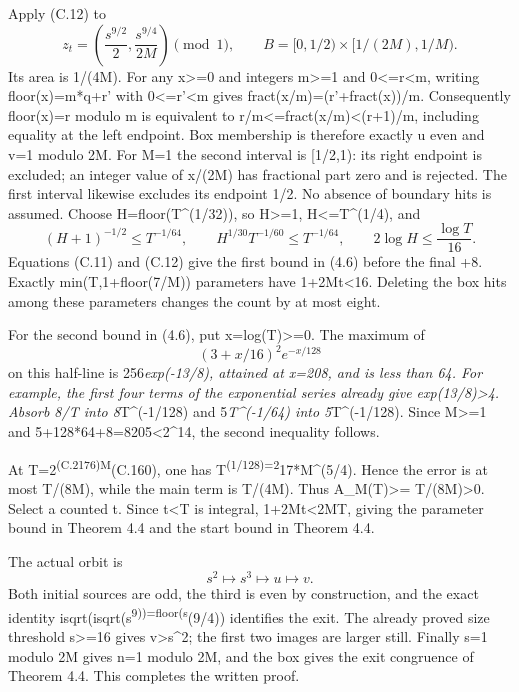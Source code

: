\documentclass[11pt,a4paper]{article}
\begin{document}
Apply (C.12) to \[
z_t=\left(\frac{s^{9/2}}2,\frac{s^{9/4}}{2M}\right)\pmod1,
\qquad B=[0,1/2)\mathbin{\times}[1/(2M),1/M).
\] Its area is 1/(4M). For any x\textgreater=0 and integers
m\textgreater=1 and 0\textless=r\textless m, writing floor(x)=m*q+r'
with 0\textless=r'\textless m gives fract(x/m)=(r'+fract(x))/m.
Consequently floor(x)=r modulo m is equivalent to
r/m\textless=fract(x/m)\textless(r+1)/m, including equality at the left
endpoint. Box membership is therefore exactly u even and v=1 modulo 2M.
For M=1 the second interval is {[}1/2,1): its right endpoint is
excluded; an integer value of x/(2M) has fractional part zero and is
rejected. The first interval likewise excludes its endpoint 1/2. No
absence of boundary hits is assumed. Choose H=floor(T\^{}(1/32)), so
H\textgreater=1, H\textless=T\^{}(1/4), and \[
(H+1)^{-1/2}\le T^{-1/64},\qquad
H^{1/30}T^{-1/60}\le T^{-1/64},\qquad
2\log H\le\frac{\log T}{16}.
\] Equations (C.11) and (C.12) give the first bound in (4.6) before the
final +8. Exactly min(T,1+floor(7/M)) parameters have 1+2Mt\textless16.
Deleting the box hits among these parameters changes the count by at
most eight.

For the second bound in (4.6), put x=log(T)\textgreater=0. The maximum
of \[
(3+x/16)^2e^{-x/128}
\] on this half-line is 256\emph{exp(-13/8), attained at x=208, and is
less than 64. For example, the first four terms of the exponential
series already give exp(13/8)\textgreater4. Absorb 8/T into
8}T\^{}(-1/128) and 5\emph{T\^{}(-1/64) into 5}T\^{}(-1/128). Since
M\textgreater=1 and 5+128*64+8=8205\textless2\^{}14, the second
inequality follows.

At T=2\textsuperscript{(C.2176)M}(C.160), one has
T\textsuperscript{(1/128)=2}17*M\^{}(5/4). Hence the error is at most
T/(8M), while the main term is T/(4M). Thus A\_M(T)\textgreater=
T/(8M)\textgreater0. Select a counted t. Since t\textless T is integral,
1+2Mt\textless2MT, giving the parameter bound in Theorem 4.4 and the
start bound in Theorem 4.4.

The actual orbit is \[
s^2\longmapsto s^3\longmapsto u\longmapsto v.
\] Both initial sources are odd, the third is even by construction, and
the exact identity isqrt(isqrt(s\textsuperscript{9))=floor(s}(9/4))
identifies the exit. The already proved size threshold s\textgreater=16
gives v\textgreater s\^{}2; the first two images are larger still.
Finally s=1 modulo 2M gives n=1 modulo 2M, and the box gives the exit
congruence of Theorem 4.4. This completes the written proof.

\clearpage
\end{document}
